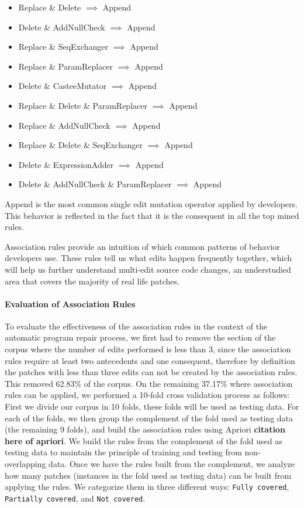 \documentclass[conference]{IEEEtran}
\newcommand{\todo}[1]
  {{\scriptsize \textbf{\color{red} {#1}}}}
\begin{document}

\begin{itemize}
 \item Replace \& Delete $\implies$ Append
 \item Delete \& AddNullCheck $\implies$ Append
 \item Replace \& SeqExchanger $\implies$ Append
 \item Replace \& ParamReplacer $\implies$ Append
 \item Delete \& CasteeMutator $\implies$ Append
 \item Replace \& Delete \& ParamReplacer $\implies$ Append
 \item Replace \& AddNullCheck $\implies$ Append
 \item Replace \& Delete \& SeqExchanger $\implies$ Append
 \item Delete \& ExpressionAdder $\implies$ Append
 \item Delete \& AddNullCheck \& ParamReplacer $\implies$ Append
\end{itemize}

Append is the most common single edit mutation operator applied by developers. This behavior is
reflected in the fact that it is the consequent in all the top mined
rules.  

Association rules provide an intuition of which common patterns of behavior
developers use. These rules tell us what edits happen frequently together, which
will help us further understand multi-edit source code changes, an understudied 
area that covers the majority of real life patches.

\paragraph{Evaluation of Association Rules}
To evaluate the effectiveness of the association rules in the context of the automatic program repair process, we first had to remove the section of the corpus where the number of edits performed is less than 3, since the association rules require at least two antecedents and one consequent, therefore by definition the patches with less than three edits can not be created by the association rules. This removed 62.83\% of the corpus. On the remaining 37.17\% where association rules can be applied, we performed a 10-fold cross validation process as follows:
First we divide our corpus in 10 folds, these folds will be used as testing data.
For each of the folds, we then group the complement of the fold used as testing data (the remaining 9 folds), and build the association rules using Apriori \todo{citation here of apriori}. We build the rules from
the complement of the fold used as testing data to maintain the principle of training and testing from non-overlapping
data.
Once we have the rules built from the complement, we analyze how many patches (instances in the fold used as testing data) can be built from applying the rules.
We categorize them in three different ways: \texttt{Fully covered}, \texttt{Partially covered}, and \texttt{Not covered}.
\end{document}
